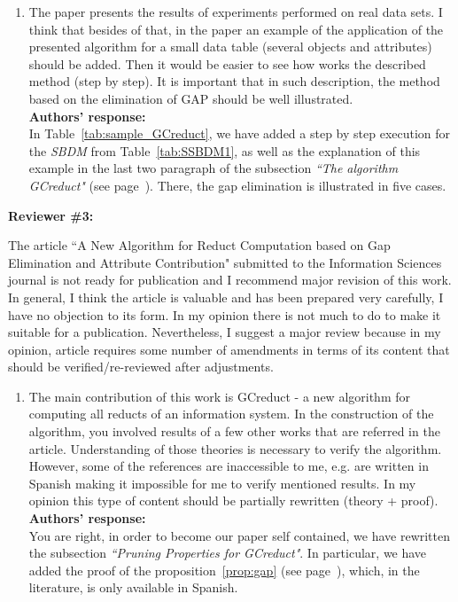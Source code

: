 \documentclass{letter}
\begin{document}
\begin{letter}{}
\begin{enumerate}
	\item The paper presents the results of experiments performed on real data sets. I think that besides of that, in the paper an example of the application of the presented algorithm for a small data table (several objects and attributes) should be added. Then it would be easier to see how works the described method (step by step). It is important that in such description, the method based on the elimination of GAP should be well illustrated.\\
	\textbf{Authors’ response:} \\
	In Table~\ref{tab:sample_GCreduct}, we have added a step by step execution for the \textit{SBDM} from Table~\ref{tab:SSBDM1}, as well as the explanation of this example in the last two paragraph of the subsection \textit{``The algorithm GCreduct"} (see page~\pageref{par:step}). There, the gap elimination is illustrated in five cases.
  \end{enumerate}    
  
  
  \textbf{Reviewer \#3:}
  
  The article ``A New Algorithm for Reduct Computation based on Gap Elimination and Attribute Contribution" submitted to the Information Sciences journal is not ready for publication and I recommend major revision of this work. In general, I think the article is valuable and has been prepared very carefully, I have no objection to its form. In my opinion there is not much to do to make it suitable for a publication. Nevertheless, I suggest a major review because in my opinion, article requires some number of amendments in terms of its content that should be verified/re-reviewed after adjustments.  
  
  \begin{enumerate}
	\item The main contribution of this work is GCreduct - a new algorithm for computing all reducts of an information system. In the construction of the algorithm, you involved results of a few other works that are referred in the article.  Understanding of those theories is necessary to verify the algorithm. However, some of the references are inaccessible  to me, e.g. are written in Spanish making it impossible for me to verify mentioned results. In my opinion this type of content should be partially rewritten (theory + proof).\\
	\textbf{Authors’ response:} \\
	You are right, in order to become our paper self contained, we have rewritten the subsection \textit{``Pruning Properties for GCreduct"}. In particular, we have added the proof of the proposition~\ref{prop:gap} (see page~\pageref{proof:gap}), which, in the literature, is only available in Spanish.
	

\end{enumerate}
\end{letter}
\end{document}

